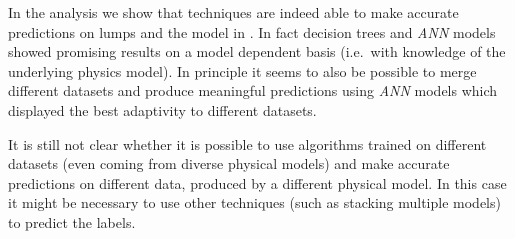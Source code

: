 In the analysis we show that \ml techniques are indeed able to make accurate predictions on lumps and the \wzw model in \sft.
In fact decision trees and \emph{ANN} models showed promising results on a model dependent basis (i.e.\ with knowledge of the underlying physics model).
In principle it seems to also be possible to merge different datasets and produce meaningful predictions using \emph{ANN} models which displayed the best adaptivity to different datasets.

It is still not clear whether it is possible to use algorithms trained on different datasets (even coming from diverse physical models) and make accurate predictions on different data, produced by a different physical model.
In this case it might be necessary to use other techniques (such as stacking multiple models) to predict the labels.
